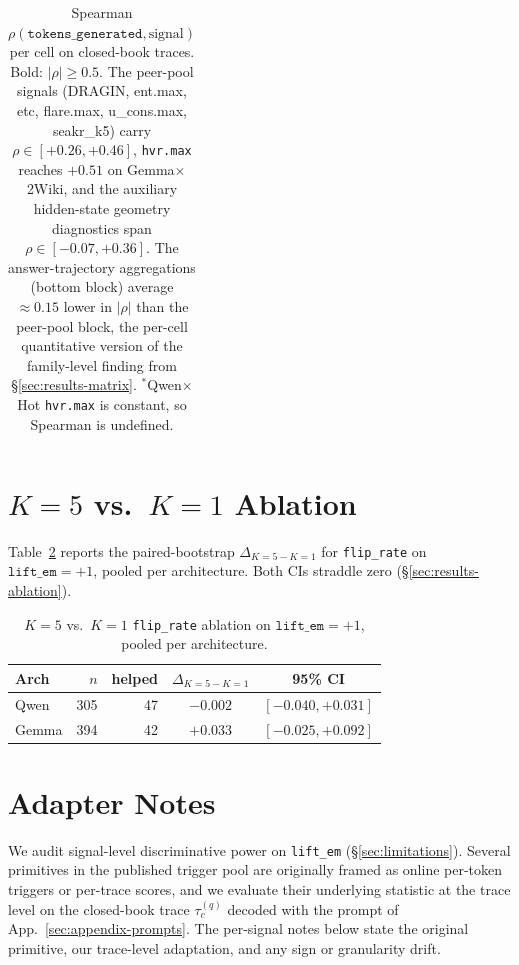 \documentclass[11pt]{article}
\begin{document}
\begin{table}[h]
{\begin{tabular}{@{}lrrrr@{}}
\bottomrule
\end{tabular}%
}
\caption{Spearman $\rho(\texttt{tokens\_generated}, \text{signal})$ per cell on closed-book traces. Bold: $|\rho| \geq 0.5$. The peer-pool signals (DRAGIN, ent.max, etc, flare.max, u\_cons.max, seakr\_k5) carry $\rho \in [+0.26, +0.46]$, \texttt{hvr.max} reaches $+0.51$ on Gemma$\times$2Wiki, and the auxiliary hidden-state geometry diagnostics span $\rho \in [-0.07, +0.36]$. The answer-trajectory aggregations (bottom block) average $\approx 0.15$ lower in $|\rho|$ than the peer-pool block, the per-cell quantitative version of the family-level finding from \S\ref{sec:results-matrix}. $^{\ast}$Qwen$\times$Hot \texttt{hvr.max} is constant, so Spearman is undefined.}
\label{tab:spearman}
\end{table}

\section{$K{=}5$ vs.\ $K{=}1$ Ablation}
\label{sec:appendix-k-ablation}

Table~\ref{tab:k-ablation} reports the paired-bootstrap $\Delta_{K{=}5 - K{=}1}$ for \texttt{flip\_rate} on $\texttt{lift\_em}{=}+1$, pooled per architecture. Both CIs straddle zero (\S\ref{sec:results-ablation}).

\begin{table}[h]
\centering\small
\begin{tabular}{@{}lrrcc@{}}
\toprule
\textbf{Arch} & $n$ & \textbf{helped} & $\Delta_{K{=}5 - K{=}1}$ & \textbf{95\% CI} \\
\midrule
Qwen  & 305 & 47 & $-0.002$ & $[-0.040, +0.031]$ \\
Gemma & 394 & 42 & $+0.033$ & $[-0.025, +0.092]$ \\
\bottomrule
\end{tabular}
\caption{$K{=}5$ vs.\ $K{=}1$ \texttt{flip\_rate} ablation on $\texttt{lift\_em}{=}+1$, pooled per architecture.}
\label{tab:k-ablation}
\end{table}

\section{Adapter Notes}
\label{sec:appendix-adapters}

We audit signal-level discriminative power on \texttt{lift\_em} (\S\ref{sec:limitations}). Several primitives in the published trigger pool are originally framed as online per-token triggers or per-trace scores, and we evaluate their underlying statistic at the trace level on the closed-book trace $\tau_c^{(q)}$ decoded with the prompt of App.~\ref{sec:appendix-prompts}. The per-signal notes below state the original primitive, our trace-level adaptation, and any sign or granularity drift.
\end{document}
